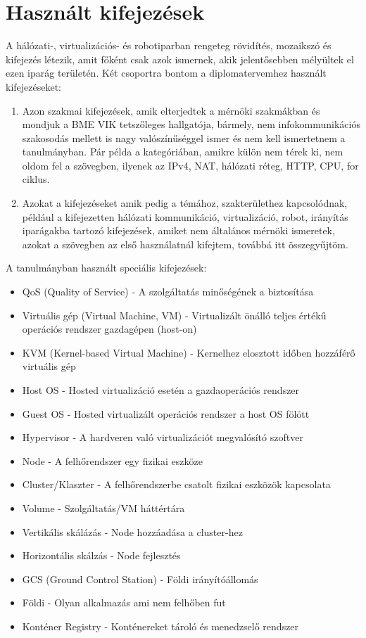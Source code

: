 \section{Használt kifejezések}
A hálózati-, virtualizációs- és robotiparban rengeteg rövidítés, mozaikszó és kifejezés létezik, amit főként csak azok ismernek, akik
jelentősebben mélyültek el ezen iparág területén. Két csoportra bontom a diplomatervemhez használt kifejezéseket:
\begin{enumerate}
	\item Azon szakmai kifejezések, amik elterjedtek a mérnöki szakmákban és mondjuk a BME VIK tetszőleges hallgatója, bármely, nem infokommunikációs szakosodás mellett is nagy valószínűséggel ismer és nem kell ismertetnem a tanulmányban. Pár példa a kategóriában, amikre külön nem térek ki, nem oldom fel a szövegben, ilyenek az IPv4, NAT, hálózati réteg, HTTP, CPU, for ciklus.
	\item Azokat a kifejezéseket amik pedig a témához, szakterülethez kapcsolódnak, például a kifejezetten hálózati kommunikáció, virtualizáció, robot, irányítás iparágakba tartozó kifejezések, amiket nem általános mérnöki ismeretek, azokat a szövegben az első használatnál kifejtem, továbbá itt összegyűjtöm.
\end{enumerate}
A tanulmányban használt speciális kifejezések:
\begin{itemize}
	\item QoS (Quality of Service) - A szolgáltatás minőségének a biztosítása
	\item Virtuális gép (Virtual Machine, VM) - Virtualizált önálló teljes értékű operációs rendszer gazdagépen (host-on)
	\item KVM (Kernel-based Virtual Machine) - Kernelhez elosztott időben hozzáférő virtuális gép
	\item Host OS - Hosted virtualizáció esetén a gazdaoperációs rendszer
	\item Guest OS - Hosted virtualizált operációs rendszer a host OS fölött
	\item Hypervisor - A hardveren való virtualizációt megvalósító szoftver
	\item Node - A felhőrendszer egy fizikai eszköze
	\item Cluster/Klaszter - A felhőrendszerbe csatolt fizikai eszközök kapcsolata
	\item Volume - Szolgáltatás/VM háttértára
	\item Vertikális skálázás - Node hozzáadása a cluster-hez
	\item Horizontális skálzás - Node fejlesztés
	\item GCS (Ground Control Station) - Földi irányítóállomás
	\item Földi - Olyan alkalmazás ami nem felhőben fut
	\item Konténer Registry - Konténereket tároló és menedzselő rendszer
\end{itemize}